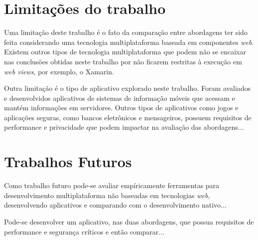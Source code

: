 \section{Limitações do trabalho} \label{section:limitacoestrabalho}
Uma limitação deste trabalho é o fato da comparação entre abordagens ter sido feita considerando uma tecnologia multiplataforma baseada em componentes \textit{web}. Existem outros tipos de tecnologia multiplataforma 
que podem não se encaixar nas conclusões obtidas neste trabalho por não ficarem restritas à execução em \textit{web views}, por exemplo, o Xamarin. 

Outra limitação é o tipo de aplicativo explorado neste trabalho. Foram avaliados e desenvolvidos aplicativos de sistemas de informação móveis que acessam e mantém informações em servidores. 
Outros tipos de aplicativos como jogos e aplicações seguras, como bancos eletrônicos e mensageiros, possuem requisitos de performance e privacidade que podem impactar na avaliação das abordagens... 

\section{Trabalhos Futuros} \label{section:trabalhosfuturos}
Como trabalho futuro pode-se avaliar empíricamente ferramentas para desenvolvimento multiplataforma não baseadas em tecnologias \textit{web}, desenvolvendo aplicativos e comparando com o desenvolvimento nativo...

Pode-se desenvolver um aplicativo, nas duas abordagens, que possua requisitos de performance e segurança críticos e então comparar... 

